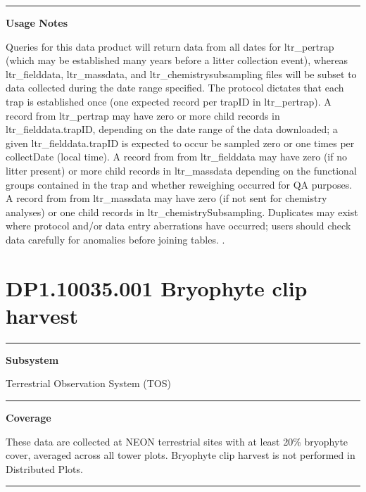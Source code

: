 \documentclass[]{article}
\begin{document}
\begin{center}\rule{0.5\linewidth}{\linethickness}\end{center}

\textbf{Usage Notes}

Queries for this data product will return data from all dates for
ltr\_pertrap (which may be established many years before a litter
collection event), whereas ltr\_fielddata, ltr\_massdata, and
ltr\_chemistrysubsampling files will be subset to data collected during
the date range specified. The protocol dictates that each trap is
established once (one expected record per trapID in ltr\_pertrap). A
record from ltr\_pertrap may have zero or more child records in
ltr\_fielddata.trapID, depending on the date range of the data
downloaded; a given ltr\_fielddata.trapID is expected to occur be
sampled zero or one times per collectDate (local time). A record from
from ltr\_fielddata may have zero (if no litter present) or more child
records in ltr\_massdata depending on the functional groups contained in
the trap and whether reweighing occurred for QA purposes. A record from
from ltr\_massdata may have zero (if not sent for chemistry analyses) or
one child records in ltr\_chemistrySubsampling. Duplicates may exist
where protocol and/or data entry aberrations have occurred; users should
check data carefully for anomalies before joining tables. \newpage
.

\section{DP1.10035.001 Bryophyte clip
harvest}\label{dp1.10035.001-bryophyte-clip-harvest}

\begin{center}\rule{0.5\linewidth}{\linethickness}\end{center}

\textbf{Subsystem}

Terrestrial Observation System (TOS)

\begin{center}\rule{0.5\linewidth}{\linethickness}\end{center}

\textbf{Coverage}

These data are collected at NEON terrestrial sites with at least 20\%
bryophyte cover, averaged across all tower plots. Bryophyte clip harvest
is not performed in Distributed Plots.

\begin{center}\rule{0.5\linewidth}{\linethickness}\end{center}
\end{document}
